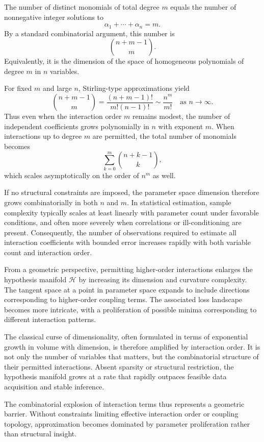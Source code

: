 \documentclass[12pt]{book}
\begin{document}
The number of distinct monomials of total degree $m$ equals the number of nonnegative integer solutions to
\[
\alpha_1 + \cdots + \alpha_n = m.
\]
By a standard combinatorial argument, this number is
\[
\binom{n+m-1}{m}.
\]
Equivalently, it is the dimension of the space of homogeneous polynomials of degree $m$ in $n$ variables.

For fixed $m$ and large $n$, Stirling-type approximations yield
\[
\binom{n+m-1}{m}
=
\frac{(n+m-1)!}{m!(n-1)!}
\sim
\frac{n^m}{m!}
\quad \text{as } n \to \infty.
\]
Thus even when the interaction order $m$ remains modest, the number of independent coefficients grows polynomially in $n$ with exponent $m$. When interactions up to degree $m$ are permitted, the total number of monomials becomes
\[
\sum_{k=0}^{m} \binom{n+k-1}{k},
\]
which scales asymptotically on the order of $n^m$ as well.

If no structural constraints are imposed, the parameter space dimension therefore grows combinatorially in both $n$ and $m$. In statistical estimation, sample complexity typically scales at least linearly with parameter count under favorable conditions, and often more severely when correlations or ill-conditioning are present. Consequently, the number of observations required to estimate all interaction coefficients with bounded error increases rapidly with both variable count and interaction order.

From a geometric perspective, permitting higher-order interactions enlarges the hypothesis manifold $\mathcal{H}$ by increasing its dimension and curvature complexity. The tangent space at a point in parameter space expands to include directions corresponding to higher-order coupling terms. The associated loss landscape becomes more intricate, with a proliferation of possible minima corresponding to different interaction patterns.

The classical curse of dimensionality, often formulated in terms of exponential growth in volume with dimension, is therefore amplified by interaction order. It is not only the number of variables that matters, but the combinatorial structure of their permitted interactions. Absent sparsity or structural restriction, the hypothesis manifold grows at a rate that rapidly outpaces feasible data acquisition and stable inference.

The combinatorial explosion of interaction terms thus represents a geometric barrier. Without constraints limiting effective interaction order or coupling topology, approximation becomes dominated by parameter proliferation rather than structural insight.
\end{document}
